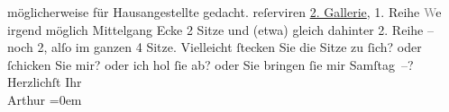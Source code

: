 \begin{ledgroupsized}[t]{13cm}
{{{                  möglicherweise für Hausangestellte gedacht.}}}\label{K_L03035-1h} reſerviren\pend
           \pstart
           \uline{2. Gallerie}, 1. Reihe \pend
           \pstart
           \textcolor{gray}{W}e{\geminationn} irgend möglich Mittelgang Ecke 2
               Sitze und \introOben{}(etwa)\introOben{} gleich dahinter 2. Reihe – noch 2, alſo {\pb}im ganzen 4 Sitze.\pend
           \pstart
           Vielleicht ſtecken Sie die Sitze zu ſich? oder ſchicken Sie mir? oder ich hol
               ſie ab? oder Sie bringen ſie mir Samſtag –? {\\[\baselineskip]}Herzlichſt Ihr {\\[\baselineskip]}\spacefill\mbox{Arthur}\pend
           \leftskip=0em{}
         
         \endnumbering{}\end{ledgroupsized}\begin{anhang}\end{anhang}\newcommand{\dateiname}{L03035}\newcommand{\titel}{Arthur Schnitzler an Felix Salten, [vor dem 16. 11. 1901?]}\newcommand{\editorInnen}{Martin Anton Müller und Laura Untner}
      